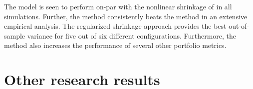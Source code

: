 \documentclass[12pt, oneside]{book}\usepackage{knitr}
\begin{document}
The model is seen to perform on-par with the nonlinear shrinkage of \citet{lw20} in all simulations.
Further, the method consistently beats the \citet{lw20} method in an extensive empirical analysis.
The regularized shrinkage approach provides the best out-of-sample variance for five out of six different configurations.
Furthermore, the method also increases the performance of several other portfolio metrics.


\section{Other research results}\label{sec:other_results}
\end{document}
